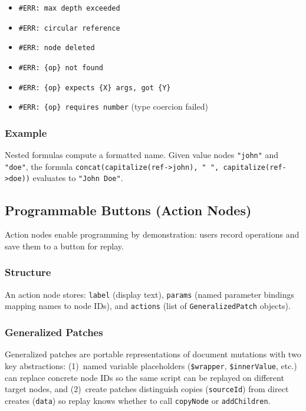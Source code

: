 \documentclass{article}
\begin{document}
\begin{itemize}
\setlength{\itemsep}{-5pt}
\item \texttt{\#ERR: max depth exceeded}
\item \texttt{\#ERR: circular reference}
\item \texttt{\#ERR: node deleted}
\item \texttt{\#ERR: \{op\} not found}
\item \texttt{\#ERR: \{op\} expects \{X\} args, got \{Y\}}
\item \texttt{\#ERR: \{op\} requires number} (type coercion failed)
\end{itemize}

\subsubsection{Example}

Nested formulas compute a formatted name. Given value nodes \texttt{"john"} and \texttt{"doe"}, the formula \texttt{concat(capitalize(ref->john), " ", capitalize(ref->doe))} evaluates to \texttt{"John Doe"}.


\subsection{Programmable Buttons (Action Nodes)}

Action nodes enable programming by demonstration: users record operations and save them to a button for replay.

\subsubsection{Structure}

An action node stores: \texttt{label} (display text), \texttt{params} (named parameter bindings mapping names to node IDs), and \texttt{actions} (list of \texttt{GeneralizedPatch} objects).

\subsubsection{Generalized Patches}

Generalized patches are portable representations of document mutations with two key abstractions: (1)~named variable placeholders (\texttt{\$wrapper}, \texttt{\$innerValue}, etc.) can replace concrete node IDs so the same script can be replayed on different target nodes, and (2)~create patches distinguish copies (\texttt{sourceId}) from direct creates (\texttt{data}) so replay knows whether to call \texttt{copyNode} or \texttt{addChildren}.
\end{document}
